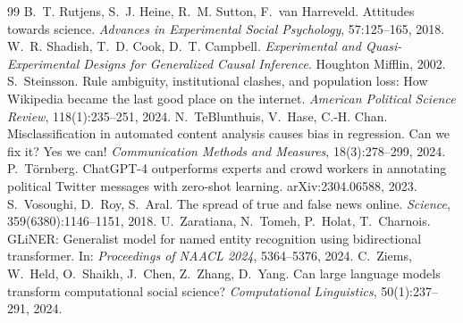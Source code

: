 \documentclass[10pt,a4paper]{article}
\begin{document}
\begin{thebibliography}{99}
 B.~T. Rutjens, S.~J. Heine, R.~M. Sutton, F.~van Harreveld. Attitudes towards science. \textit{Advances in Experimental Social Psychology}, 57:125--165, 2018.
 W.~R. Shadish, T.~D. Cook, D.~T. Campbell. \textit{Experimental and Quasi-Experimental Designs for Generalized Causal Inference}. Houghton Mifflin, 2002.
 S.~Steinsson. Rule ambiguity, institutional clashes, and population loss: How Wikipedia became the last good place on the internet. \textit{American Political Science Review}, 118(1):235--251, 2024.
 N.~TeBlunthuis, V.~Hase, C.-H. Chan. Misclassification in automated content analysis causes bias in regression. Can we fix it? Yes we can! \textit{Communication Methods and Measures}, 18(3):278--299, 2024.
 P.~Törnberg. ChatGPT-4 outperforms experts and crowd workers in annotating political Twitter messages with zero-shot learning. arXiv:2304.06588, 2023.
 S.~Vosoughi, D.~Roy, S.~Aral. The spread of true and false news online. \textit{Science}, 359(6380):1146--1151, 2018.
 U.~Zaratiana, N.~Tomeh, P.~Holat, T.~Charnois. GLiNER: Generalist model for named entity recognition using bidirectional transformer. In: \textit{Proceedings of NAACL 2024}, 5364--5376, 2024.
 C.~Ziems, W.~Held, O.~Shaikh, J.~Chen, Z.~Zhang, D.~Yang. Can large language models transform computational social science? \textit{Computational Linguistics}, 50(1):237--291, 2024.
\end{thebibliography}
\end{document}
